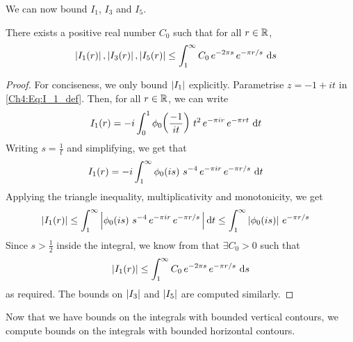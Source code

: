 We can now bound $I_1$, $I_3$ and $I_5$.

\begin{boxlemma}\label{Ch4:Lemma:Bound_I1_I3_I5}
    There exists a positive real number $C_0$ such that for all $r \in \mathbb{R}$,
    \begin{align*}
        \left\lvert I_1(r) \right\rvert, \left\lvert I_3(r) \right\rvert, \left\lvert I_5(r) \right\rvert &\leq \int_{1}^{\infty} C_0 \, e^{-2\pi s} \, e^{-\pi r/s} \, \operatorname{d}\!{s}
    \end{align*}
\end{boxlemma}
\begin{proof}
    For conciseness, we only bound $\left\lvert I_1 \right\rvert$ explicitly. Parametrise $z = -1 + it$ in \eqref{Ch4:Eq:I_1_def}. Then, for all $r \in \mathbb{R}$, we can write
    \begin{align*}
        I_1(r) &= -i \int_{0}^{1}
            \phi_0\!\left( \frac{-1}{it} \right) \,
            t^2 \,
            e^{-\pi i r} \,
            e^{-\pi r t}\,
            \operatorname{d}\!{t}
    \end{align*}
    Writing $s = \frac{1}{t}$ and simplifying, we get that
    \begin{align*}
        I_1(r) &= -i \int_{1}^{\infty}
            \phi_0\!\left( is \right) \,
            s^{-4} \,
            e^{-\pi i r} \,
            e^{-\pi r / s}\,
            \operatorname{d}\!{t}
    \end{align*}
    Applying the triangle inequality, multiplicativity and monotonicity, we get
    \begin{align*}
        \left\lvert I_1(r) \right\rvert &\leq \int_{1}^{\infty} \left\lvert 
            \phi_0\!\left( is \right) \,
            s^{-4} \,
            e^{-\pi i r} \,
            e^{-\pi r / s}\,
             \right\rvert \operatorname{d}\!{t}
        \leq \int_{1}^{\infty}
            \left\lvert \phi_0\!\left( is \right) \right\rvert \,
            e^{-\pi r/s}
    \end{align*}
    Since $s > \frac{1}{2}$ inside the integral, we know from  that $\exists C_0 > 0$ such that
    \begin{align*}
        \left\lvert I_1(r) \right\rvert \leq \int_{1}^{\infty} C_0 \, e^{-2\pi s} \, e^{-\pi r/s} \, \operatorname{d}\!{s}
    \end{align*}
    as required. The bounds on $\left\lvert I_3 \right\rvert$ and $\left\lvert I_5 \right\rvert$ are computed similarly.
\end{proof}

Now that we have bounds on the integrals with bounded vertical contours, we compute bounds on the integrals with bounded horizontal contours.

